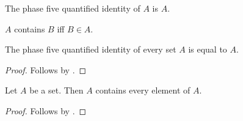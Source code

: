\begin{abbreviation}\label{phase5_quantified_identity}
    The phase five quantified identity of $A$ is $A$.
\end{abbreviation}

\begin{abbreviation}\label{phase5_quantified_contains}
    $A$ contains $B$ iff $B\in A$.
\end{abbreviation}

\begin{proposition}\label{phase5_quantified_function_argument}
    The phase five quantified identity of every set $A$ is equal to $A$.
\end{proposition}
\begin{proof}
    Follows by \auto.
\end{proof}

\begin{proposition}\label{phase5_quantified_verb_argument}
    Let $A$ be a set.
    Then $A$ contains every element of $A$.
\end{proposition}
\begin{proof}
    Follows by \auto.
\end{proof}
